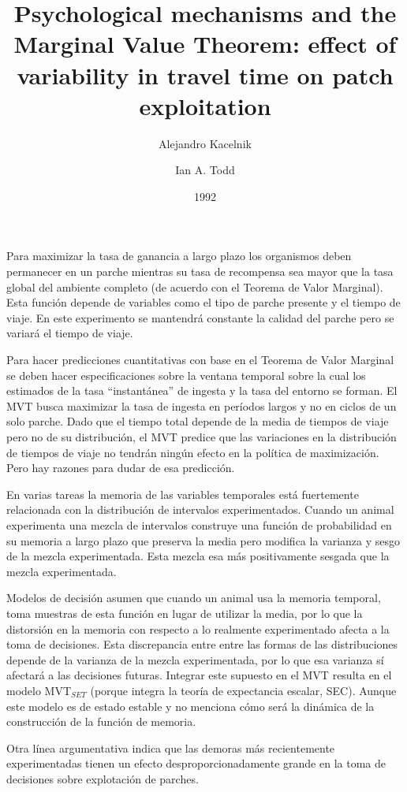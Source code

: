 \documentclass[a4paper,12pt]{article}
\title{Psychological mechanisms and the Marginal Value Theorem: effect of variability in travel time on patch exploitation}
\author{Alejandro Kacelnik \and Ian A. Todd}
\date{1992}
\begin{document}
{\scshape\bfseries \maketitle}

Para maximizar la tasa de ganancia a largo plazo los organismos deben permanecer en un parche mientras su tasa de recompensa sea mayor que la tasa global del ambiente completo (de acuerdo con el Teorema de Valor Marginal). Esta función depende de variables como el tipo de parche presente y el tiempo de viaje. En este experimento se mantendrá constante la calidad del parche pero se variará el tiempo de viaje.

Para hacer predicciones cuantitativas con base en el Teorema de Valor Marginal se deben hacer especificaciones sobre la ventana temporal sobre la cual los estimados de la tasa ``instantánea'' de ingesta y la tasa del entorno se forman. El MVT busca maximizar la tasa de ingesta en períodos largos y no en ciclos de un solo parche. Dado que el tiempo total depende de la media de tiempos de viaje pero no de su distribución, el MVT predice que las variaciones en la distribución de tiempos de viaje no tendrán ningún efecto en la política de maximización. Pero hay razones para dudar de esa predicción.

En varias tareas la memoria de las variables temporales está fuertemente relacionada con la distribución de intervalos experimentados. Cuando un animal experimenta una mezcla de intervalos construye una función de probabilidad en su memoria a largo plazo que preserva la media pero modifica la varianza y sesgo de la mezcla experimentada. Esta mezcla esa más positivamente sesgada que la mezcla experimentada. 

Modelos de decisión asumen que cuando un animal usa la memoria temporal, toma muestras de esta función en lugar de utilizar la media, por lo que la distorsión en la memoria con respecto a lo realmente experimentado afecta a la toma de decisiones. Esta discrepancia entre entre las formas de las distribuciones depende de la varianza de la mezcla experimentada, por lo que esa varianza sí afectará a las decisiones futuras. Integrar este supuesto en el MVT resulta en el modelo MVT$_{SET}$ (porque integra la teoría de expectancia escalar, SEC). Aunque este modelo es de estado estable y no menciona cómo será la dinámica de la construcción de la función de memoria.

Otra línea argumentativa indica que las demoras más recientemente experimentadas tienen un efecto desproporcionadamente grande en la toma de decisiones sobre explotación de parches. 
\end{document}
